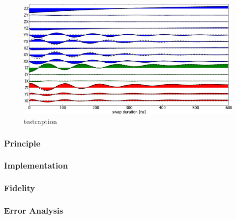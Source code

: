 \begin{figure}
   \centering
	 \includegraphics[width=1.\textwidth]{"./data/ct5/film of swap/pauli_set_vs_time_with_simulation"}
	 \caption[test]{testcaption}
	 \label{fig:swap_pauli_set_vs_time_with_simulation}
\end{figure}

\subsubsection{Principle}

\subsubsection{Implementation}

\subsubsection{Fidelity}

\subsubsection{Error Analysis}


